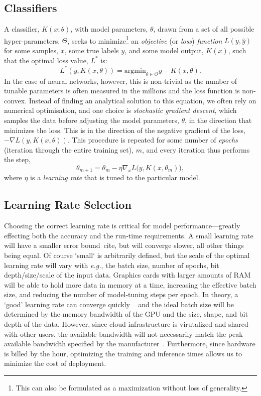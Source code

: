 \documentclass[conference]{IEEEtran}
\begin{document}
\subsection{Classifiers}

A classifier, $K(x; \theta)$, with model parameters, $\theta$, drawn from a set of all possible hyper-parameters, $\Theta$, seeks to minimize\footnote{This can also be formulated as a maximization without loss of generality.} an \textit{objective} (or \textit{loss}) \textit{function} $L(y, \hat{y})$ for some samples, $x$, some true labels $y$, and some model output, $K(x)$, such that the optimal loss value, $L^*$ is:
\[
L^*(y, K(x, \theta)) = \mathrm{argmin}_{\theta \in \Theta} y - K(x, \theta).
\]
 In the case of neural networks, however, this is non-trivial as the number of tunable parameters is often measured in the millions and the loss function is non-convex. Instead of finding an analytical solution to this equation, we often rely on numerical optimisation, and one choice is \textit{stochastic gradient descent}, which samples the data before adjusting the model parameters, $\theta$, in the direction that minimizes the loss. This is in the direction of the negative gradient of the loss, $-\nabla L(y, K(x, \theta))$. This procedure is repeated for some number of \textit{epochs} (iteration through the entire training set), $m$, and every iteration thus performs the step,
\begin{equation}
    \theta_{m+1} = \theta_{m} - \eta \nabla_x L\big(y, K(x, \theta_m)\big),
\label{eq:sgd}
\end{equation}
where $\eta$ is a \textit{learning rate} that is tuned to the particular model.

\subsection{Learning Rate Selection}
\label{learning_rate}
Choosing the correct learning rate is critical for model performance---greatly effecting both the accuracy and the run-time requirements. A small learning rate will have a smaller error bound~cite{}, but will converge slower, all other things being equal. Of course `small` is arbitrarily defined, but the scale of the optimal learning rate will vary with \textit{e.g.}, the batch size, number of epochs, bit depth/size/scale of the input data. Graphics cards with larger amounts of RAM will be able to hold more data in memory at a time, increasing the effective batch size, and reducing the number of model-tuning steps per epoch. In theory, a `good' learning rate can converge quickly ~\cite{smith2019super} and the ideal batch size will be determined by the memory bandwidth of the GPU and the size, shape, and bit depth of the data. However, since cloud infrastructure is virutalized and shared with other users, the available bandwidth will not necessarily match the peak available bandwidth specified by the manufacturer~\cite{sajid2013cloud}. Furthermore, since hardware is billed by the hour, optimizing the training and inference times allows us to minimize the cost of deployment. 
\end{document}
